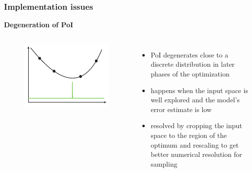 \documentclass[sans,mathserif]{beamer}
\begin{document}
\begin{frame}
  \frametitle{Implementation issues}
  \textbf{Degeneration of PoI}
  \begin{columns}[T]
  \column{5cm}
    \begin{figure}
    \includegraphics[width=\linewidth]{img/degenerate-poi}
    \end{figure}
  \column{5.5cm}
    \begin{itemize}
      \item PoI degenerates close to a discrete distribution in later phases of the optimization
      \item happens when the input space is well explored and the model's error estimate is low
      \item resolved by \alert{cropping} the input space to the region of the optimum and \alert{rescaling} to get
        better numerical resolution for sampling
    \end{itemize}
  \end{columns}
\end{frame}
\end{document}
